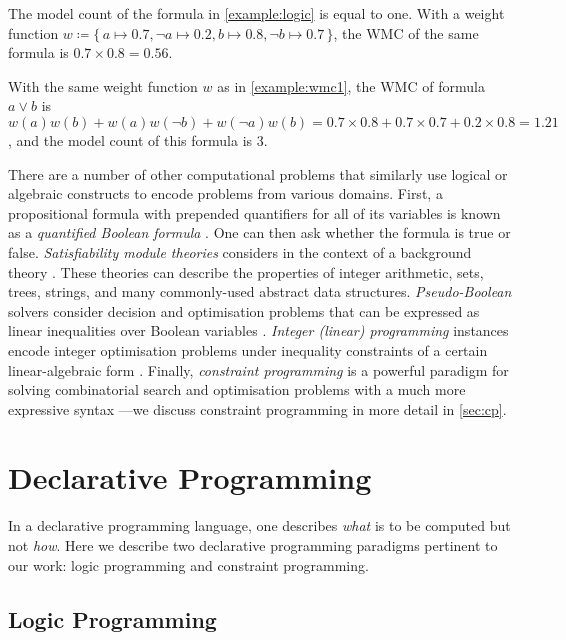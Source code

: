 \begin{example} \label{example:wmc1}
  The model count of the formula in \cref{example:logic} is equal to one. With a weight function $w \coloneqq \{\, a \mapsto 0.7, \neg a \mapsto 0.2, b \mapsto 0.8, \neg b \mapsto 0.7 \,\}$, the WMC of the same formula is $0.7 \times 0.8 = 0.56$.
\end{example}

\begin{example}
  With the same weight function $w$ as in \cref{example:wmc1}, the WMC of formula $a \lor b$ is $w(a)w(b) + w(a)w(\neg b) + w(\neg a)w(b) = 0.7 \times 0.8 + 0.7 \times 0.7 + 0.2 \times 0.8 = 1.21$, and the model count of this formula is 3.
\end{example}

There are a number of other computational problems that similarly use logical or algebraic constructs to encode problems from various domains. First, a propositional formula with prepended quantifiers for all of its variables is known as a \emph{quantified Boolean formula} \citep{DBLP:series/faia/BuningB09}. One can then ask whether the formula is true or false. \emph{Satisfiability module theories} considers \SAT{} in the context of a background theory \citep{DBLP:series/faia/BarrettSST09}. These theories can describe the properties of integer arithmetic, sets, trees, strings, and many commonly-used abstract data structures. \emph{Pseudo-Boolean} solvers consider decision and optimisation problems that can be expressed as linear inequalities over Boolean variables \citep{DBLP:series/faia/RousselM09}. \emph{Integer (linear) programming} instances encode integer optimisation problems under inequality constraints of a certain linear-algebraic form \citep{wolsey2020integer}. Finally, \emph{constraint programming} is a powerful paradigm for solving combinatorial search and optimisation problems with a much more expressive syntax \citep{DBLP:reference/fai/2}---we discuss constraint programming in more detail in \cref{sec:cp}.

\section{Declarative Programming}

In a declarative programming language, one describes \emph{what} is to be computed but not \emph{how}. Here we describe two declarative programming paradigms pertinent to our work: logic programming and constraint programming.

\subsection{Logic Programming} \label{sec:lp}

